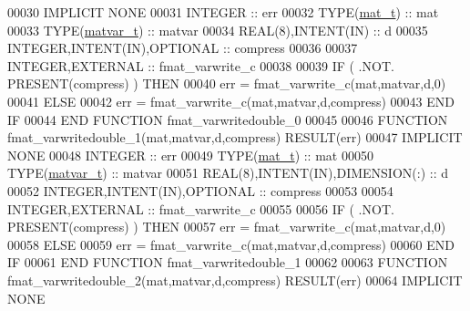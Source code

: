 \begin{DoxyCode}
00030 \textcolor{keywordtype}{IMPLICIT NONE}
00031     \textcolor{keywordtype}{INTEGER}                                  :: err
00032     \textcolor{keywordtype}{TYPE}(\hyperlink{group___m_a_t_gab0fc888f5a5d79943b16284b1f91c2e8}{mat\_t})                              :: mat
00033     \textcolor{keywordtype}{TYPE}(\hyperlink{group___m_a_t_structmatvar__t}{matvar\_t})                           :: matvar
00034     \textcolor{keywordtype}{REAL(8)},\textcolor{keywordtype}{INTENT(IN)}                       :: d
00035     \textcolor{keywordtype}{INTEGER},\textcolor{keywordtype}{INTENT(IN)},\textcolor{keywordtype}{OPTIONAL}              :: compress
00036 
00037     \textcolor{keywordtype}{INTEGER},\textcolor{keywordtype}{EXTERNAL}                         :: fmat\_varwrite\_c
00038 
00039     \textcolor{keywordflow}{IF} ( .NOT. \textcolor{keyword}{PRESENT}(compress) ) \textcolor{keywordflow}{THEN}
00040         err = fmat\_varwrite\_c(mat,matvar,d,0)
00041     \textcolor{keywordflow}{ELSE}
00042         err = fmat\_varwrite\_c(mat,matvar,d,compress)
00043 \textcolor{keywordflow}{    END IF}
00044 \textcolor{keyword}{END FUNCTION }fmat\_varwritedouble\_0
00045 
00046 \textcolor{keyword}{FUNCTION }fmat\_varwritedouble\_1(mat,matvar,d,compress) \textcolor{keyword}{RESULT}(err)
00047 \textcolor{keywordtype}{IMPLICIT NONE}
00048     \textcolor{keywordtype}{INTEGER}                                  :: err
00049     \textcolor{keywordtype}{TYPE}(\hyperlink{group___m_a_t_gab0fc888f5a5d79943b16284b1f91c2e8}{mat\_t})                              :: mat
00050     \textcolor{keywordtype}{TYPE}(\hyperlink{group___m_a_t_structmatvar__t}{matvar\_t})                           :: matvar
00051     \textcolor{keywordtype}{REAL(8)},\textcolor{keywordtype}{INTENT(IN)},\textcolor{keywordtype}{DIMENSION(:)}          :: d
00052     \textcolor{keywordtype}{INTEGER},\textcolor{keywordtype}{INTENT(IN)},\textcolor{keywordtype}{OPTIONAL}              :: compress
00053 
00054     \textcolor{keywordtype}{INTEGER},\textcolor{keywordtype}{EXTERNAL}                         :: fmat\_varwrite\_c
00055 
00056     \textcolor{keywordflow}{IF} ( .NOT. \textcolor{keyword}{PRESENT}(compress) ) \textcolor{keywordflow}{THEN}
00057         err = fmat\_varwrite\_c(mat,matvar,d,0)
00058     \textcolor{keywordflow}{ELSE}
00059         err = fmat\_varwrite\_c(mat,matvar,d,compress)
00060 \textcolor{keywordflow}{    END IF}
00061 \textcolor{keyword}{END FUNCTION }fmat\_varwritedouble\_1
00062 
00063 \textcolor{keyword}{FUNCTION }fmat\_varwritedouble\_2(mat,matvar,d,compress) \textcolor{keyword}{RESULT}(err)
00064 \textcolor{keywordtype}{IMPLICIT NONE}

\end{DoxyCode}
